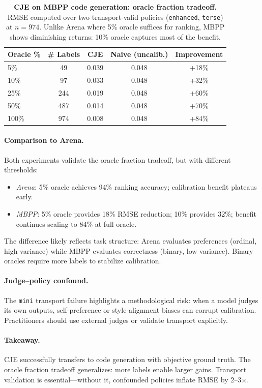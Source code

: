 \begin{table}[h]
\centering
\small
\caption{\textbf{CJE on MBPP code generation: oracle fraction tradeoff.}
RMSE computed over two transport-valid policies (\texttt{enhanced}, \texttt{terse}) at $n{=}974$.
Unlike Arena where 5\% oracle suffices for ranking, MBPP shows diminishing returns: 10\% oracle captures most of the benefit.}
\label{tab:mbpp-results}
\begin{tabular}{lcccc}
\toprule
Oracle \% & \# Labels & CJE & Naive (uncalib.) & Improvement \\
\midrule
5\%   & 49   & 0.039 & 0.048 & +18\% \\
10\%  & 97   & 0.033 & 0.048 & +32\% \\
25\%  & 244  & 0.019 & 0.048 & +60\% \\
50\%  & 487  & 0.014 & 0.048 & +70\% \\
100\% & 974  & 0.008 & 0.048 & +84\% \\
\bottomrule
\end{tabular}
\end{table}

\paragraph{Comparison to Arena.}
Both experiments validate the oracle fraction tradeoff, but with different thresholds:
\begin{itemize}[leftmargin=*,nosep]
\item \emph{Arena}: 5\% oracle achieves 94\% ranking accuracy; calibration benefit plateaus early.
\item \emph{MBPP}: 5\% oracle provides 18\% RMSE reduction; 10\% provides 32\%; benefit continues scaling to 84\% at full oracle.
\end{itemize}
The difference likely reflects task structure: Arena evaluates preferences (ordinal, high variance) while MBPP evaluates correctness (binary, low variance). Binary oracles require more labels to stabilize calibration.

\paragraph{Judge--policy confound.}
The \texttt{mini} transport failure highlights a methodological risk: when a model judges its own outputs, self-preference or style-alignment biases can corrupt calibration.
Practitioners should use external judges or validate transport explicitly.

\paragraph{Takeaway.}
CJE successfully transfers to code generation with objective ground truth.
The oracle fraction tradeoff generalizes: more labels enable larger gains.
Transport validation is essential---without it, confounded policies inflate RMSE by 2--3$\times$.
